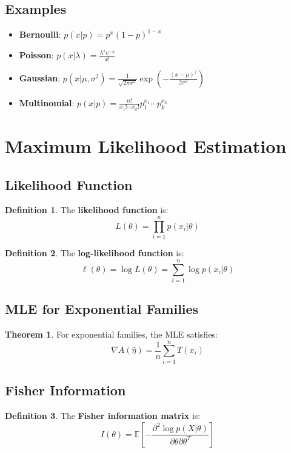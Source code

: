 \documentclass[11pt]{article}
\theoremstyle{definition}
\newtheorem{definition}{Definition}[section]
\newtheorem{theorem}{Theorem}[section]
\begin{document}
\subsection{Examples}
\begin{itemize}
    \item \textbf{Bernoulli}: $p(x|p) = p^x(1-p)^{1-x}$
    \item \textbf{Poisson}: $p(x|\lambda) = \frac{\lambda^x e^{-\lambda}}{x!}$
    \item \textbf{Gaussian}: $p(x|\mu,\sigma^2) = \frac{1}{\sqrt{2\pi\sigma^2}} \exp(-\frac{(x-\mu)^2}{2\sigma^2})$
    \item \textbf{Multinomial}: $p(x|p) = \frac{n!}{x_1!\cdots x_k!} p_1^{x_1} \cdots p_k^{x_k}$
\end{itemize}

\section{Maximum Likelihood Estimation}

\subsection{Likelihood Function}
\begin{definition}
The \textbf{likelihood function} is:
$$L(\theta) = \prod_{i=1}^n p(x_i|\theta)$$
\end{definition}

\begin{definition}
The \textbf{log-likelihood function} is:
$$\ell(\theta) = \log L(\theta) = \sum_{i=1}^n \log p(x_i|\theta)$$
\end{definition}

\subsection{MLE for Exponential Families}
\begin{theorem}
For exponential families, the MLE satisfies:
$$\nabla A(\hat{\eta}) = \frac{1}{n} \sum_{i=1}^n T(x_i)$$
\end{theorem}

\subsection{Fisher Information}
\begin{definition}
The \textbf{Fisher information matrix} is:
$$I(\theta) = \mathbb{E}\left[-\frac{\partial^2 \log p(X|\theta)}{\partial \theta \partial \theta^T}\right]$$
\end{definition}
\end{document}
